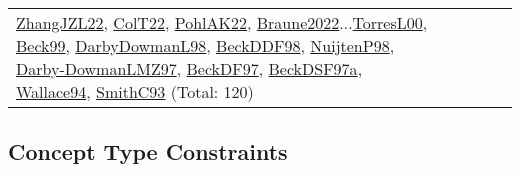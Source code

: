 {\begin{longtable}{p{3cm}r>{\raggedright\arraybackslash}p{6cm}>{\raggedright\arraybackslash}p{6cm}>{\raggedright\arraybackslash}p{8cm}}
\hyperref[detail:ZhangJZL22]{ZhangJZL22}, \hyperref[detail:ColT22]{ColT22}, \hyperref[detail:PohlAK22]{PohlAK22}, \hyperref[detail:Braune2022]{Braune2022}...\hyperref[detail:TorresL00]{TorresL00}, \hyperref[detail:Beck99]{Beck99}, \hyperref[detail:DarbyDowmanL98]{DarbyDowmanL98}, \hyperref[detail:BeckDDF98]{BeckDDF98}, \hyperref[detail:NuijtenP98]{NuijtenP98}, \hyperref[detail:Darby-DowmanLMZ97]{Darby-DowmanLMZ97}, \hyperref[detail:BeckDF97]{BeckDF97}, \hyperref[detail:BeckDSF97a]{BeckDSF97a}, \hyperref[detail:Wallace94]{Wallace94}, \hyperref[detail:SmithC93]{SmithC93} (Total: 120)\\
\end{longtable}
}

\clearpage
\subsection{Concept Type Constraints}
\label{sec:Constraints}
\label{Constraints}
